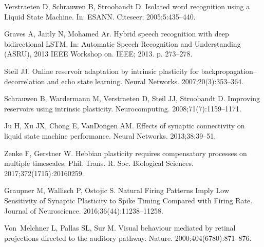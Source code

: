 \documentclass[10pt,letterpaper]{article}
\begin{document}
\begin{thebibliography}{10}
Verstraeten D, Schrauwen B, Stroobandt D.
\newblock Isolated word recognition using a Liquid State Machine.
\newblock In: ESANN. Citeseer; 2005;5:435--440.

Graves A, Jaitly N, Mohamed Ar.
\newblock Hybrid speech recognition with deep bidirectional LSTM.
\newblock In: Automatic Speech Recognition and Understanding (ASRU), 2013 IEEE
  Workshop on. IEEE; 2013. p. 273--278.

Steil JJ.
\newblock Online reservoir adaptation by intrinsic plasticity for
  backpropagation--decorrelation and echo state learning.
\newblock Neural Networks. 2007;20(3):353--364.

Schrauwen B, Wardermann M, Verstraeten D, Steil JJ, Stroobandt D.
\newblock Improving reservoirs using intrinsic plasticity.
\newblock Neurocomputing. 2008;71(7):1159--1171.

Ju H, Xu JX, Chong E, VanDongen AM.
\newblock Effects of synaptic connectivity on liquid state machine performance.
\newblock Neural Networks. 2013;38:39--51.

Zenke F, Gerstner W.
\newblock Hebbian plasticity requires compensatory processes on multiple
  timescales.
\newblock Phil. Trans. R. Soc. Biological Sciences. 2017;372(1715):20160259.

Graupner M, Wallisch P, Ostojic S.
\newblock Natural Firing Patterns Imply Low Sensitivity of Synaptic Plasticity
  to Spike Timing Compared with Firing Rate.
\newblock Journal of Neuroscience. 2016;36(44):11238--11258.

Von~Melchner L, Pallas SL, Sur M.
\newblock Visual behaviour mediated by retinal projections directed to the
  auditory pathway.
\newblock Nature. 2000;404(6780):871--876.

\end{thebibliography}
\end{document}

